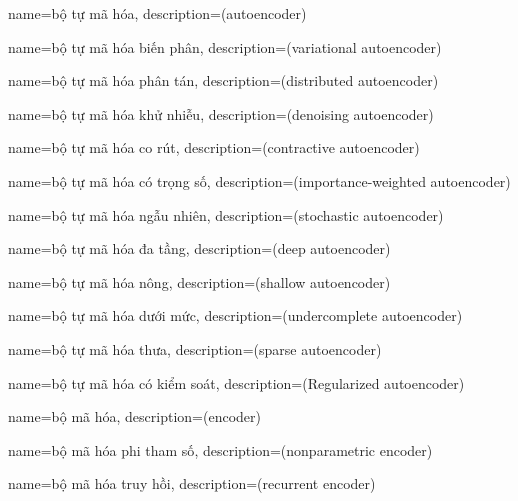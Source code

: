 {
    name={bộ tự mã hóa},
    description={(autoencoder)}
}

{
    name={bộ tự mã hóa biến phân},
    description={(variational autoencoder)}
}


{
    name={bộ tự mã hóa phân tán},
    description={(distributed autoencoder)}
}

{
    name={bộ tự mã hóa khử nhiễu},
    description={(denoising autoencoder)}
}


{
    name={bộ tự mã hóa co rút},
    description={(contractive autoencoder)}
}


{
    name={bộ tự mã hóa có trọng số},
    description={(importance-weighted autoencoder)}
}

{
    name={bộ tự mã hóa ngẫu nhiên},
    description={(stochastic autoencoder)}
}

{
    name={bộ tự mã hóa đa tầng},
    description={(deep autoencoder)}
}

{
    name={bộ tự mã hóa nông},
    description={(shallow autoencoder)}
}

{
    name={bộ tự mã hóa dưới mức},
    description={(undercomplete autoencoder)}
}

{
    name={bộ tự mã hóa thưa},
    description={(sparse autoencoder)}
}

{
    name={bộ tự mã hóa có kiểm soát},
    description={(Regularized autoencoder)}
}

{
    name={bộ mã hóa},
    description={(encoder)}
}

{
    name={bộ mã hóa phi tham số},
    description={(nonparametric encoder)}
}

{
    name={bộ mã hóa truy hồi},
    description={(recurrent encoder)}
}


